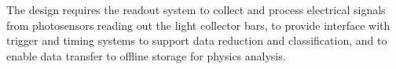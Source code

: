 

The  design requires the readout system to collect and process electrical signals from photosensors reading out the light collector bars, 
to provide interface with trigger and timing systems to support data reduction and classification, and to enable data transfer 
to offline storage for physics analysis.

